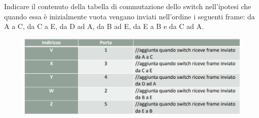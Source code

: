 \documentclass[11pt,a4paper,oneside]{book}
\theoremstyle{definition}
\begin{document}
\begin{enumerate}
	      Indicare il contenuto della tabella di
	      commutazione dello switch nell'ipotesi che
	      quando essa è inizialmente vuota vengano inviati
	      nell'ordine i seguenti frame: da A a C, da C a E, da D ad A, da B ad E, da E a B e da C ad A.

	      \begin{figure}[!h]
		      \includegraphics[scale=0.27]{Immagini/Es10_sol.png}
		      \centering
	      \end{figure}
\end{enumerate}
\end{document}
